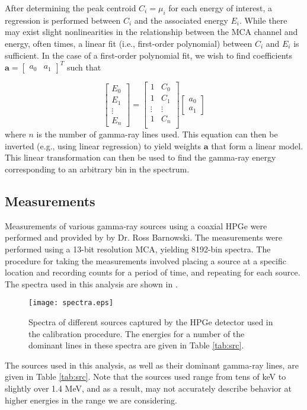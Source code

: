 After determining the peak centroid $C_i = \mu_i$ for each energy of interest, a regression is performed between $C_i$ and the associated energy $E_i$.
While there may exist slight nonlinearities in the relationship between the MCA channel and energy, often times, a linear fit (i.e., first-order polynomial) between $C_i$ and $E_i$ is sufficient.
In the case of a first-order polynomial fit, we wish to find coefficients
$\mathbf{a} = \begin{bmatrix}a_0 & a_1 \end{bmatrix}^T$ such that

\begin{equation}
    \begin{bmatrix}
        E_0 \\ E_1 \\ \vdots \\ E_n
    \end{bmatrix} =
    \begin{bmatrix}
        1 & C_0 \\
        1 & C_1 \\
        \vdots & \vdots \\
        1 & C_n \\
    \end{bmatrix}
    \begin{bmatrix}
        a_0 \\ a_1
    \end{bmatrix}
\end{equation}
where $n$ is the number of gamma-ray lines used. This equation can then be inverted (e.g., using linear regression) to yield weights $\mathbf{a}$ that form a linear model.
This linear transformation can then be used to find the gamma-ray energy corresponding to an arbitrary bin in the spectrum.

\subsection{Measurements}
Measurements of various gamma-ray sources using a coaxial HPGe were performed and provided by by Dr. Ross Barnowski.
The measurements were performed using a 13-bit resolution MCA, yielding 8192-bin spectra.
The procedure for taking the measurements involved placing a source at a specific location and recording counts for a period of time, and repeating for each source.
The spectra used in this analysis are shown in .

\begin{figure}
\centering
\texttt{[image: spectra.eps]}
\caption{Spectra of different sources captured by the HPGe detector used in the calibration procedure. The energies for a number of the dominant lines in these spectra are given in Table \ref{tab:src}.}
\label{fig:spectra}
\end{figure}
The sources used in this analysis, as well as their dominant gamma-ray lines, are given in Table \ref{tab:src}.
Note that the sources used range from tens of keV to slightly over 1.4 MeV, and as a result, may not accurately describe behavior at higher energies in the range we are considering.

